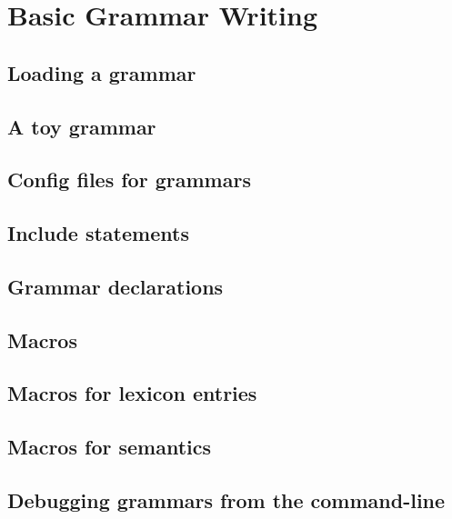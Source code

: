 \chapter{Basic Grammar Writing}
\label{Chapter:BasicGrammar}

\author{Manny Rayner}

\section{Loading a grammar}
\label{Section:LoadGrammar}

\section{A toy grammar}
\label{Section:ToyGrammar}

\section{Config files for grammars}
\label{Section:GrammarConfigs}

\section{Include statements}
\label{Section:GrammarIncludes}

\section{Grammar declarations}
\label{Section:GrammarDeclarations}

\section{Macros}
\label{Section:GrammarMacros}

\section{Macros for lexicon entries}
\label{Section:LexiconMacros}

\section{Macros for semantics}
\label{Section:SemanticsMacros}

\section{Debugging grammars from the command-line}
\label{Section:GrammarDebuggingCommandLine}

